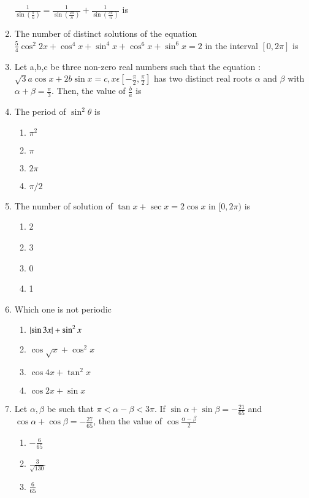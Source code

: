 \begin{enumerate}[label=\arabic*.,ref=\thesubsection.\theenumi]
    ${\frac{1}{\sin({\frac{\pi}{n}})}}= {\frac{1}{\sin({\frac{2\pi}{n}})}} + {\frac{1}{\sin({\frac{3\pi}{n}})}}$ is 
    \item The number of distinct solutions of the equation ${\frac{5}{4}}\cos^2 2x + \cos^4 x + \sin^4 x + \cos^6 x + \sin^6 x = 2$ in the interval $[0 , 2\pi]$ is
    \item Let a,b,c be three non-zero real numbers such that the equation : $\sqrt 3 a \cos x+ 2b \sin x = c , x\epsilon[{-\frac{\pi}{2}},{\frac{\pi}{2}}]$ has two distinct real roots $\alpha$ and $\beta$ with $\alpha + \beta = {\frac{\pi}{3}}$. Then, the value of ${\frac{b}{a}}$ is 
    \item The period of $\sin^2 \theta $ is 
    \begin{enumerate}
        \item $\pi^2$
        \item $\pi$
        \item $2\pi$
        \item $\pi/2$
    \end{enumerate}
    \item The number of solution of $\tan x + \sec x = 2\cos x $ in $[0,2\pi)$ is 
    \begin{enumerate}
        \item 2
        \item 3
        \item 0
        \item 1
    \end{enumerate}
    \item Which one is not periodic 
    \begin{enumerate}
        \item $\left\vert\sin3x\right\vert + \sin^2 x$
        \item $\cos\sqrt x + \cos^2 x$
        \item $\cos 4x + \tan^2 x$
        \item $\cos 2x + \sin x$
    \end{enumerate}
    \item Let $\alpha, \beta$ be such that $\pi<\alpha-\beta< 3\pi$. If $\sin\alpha + \sin \beta = {-\frac{21}{65}}$ and $\cos \alpha + \cos\beta = {-\frac{27}{65}}$, then the value of $\cos{\frac{\alpha-\beta}{2}}$
    \begin{enumerate}
        \item ${-\frac{6}{65}}$
        \item ${\frac{3}{\sqrt{130}}}$
        \item ${\frac{6}{65}}$

\end{enumerate}
\end{enumerate}
